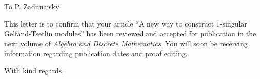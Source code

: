 \documentclass[a4paper,12pt]{letter}
\begin{document}
\begin{letter}{}

\opening{To P. Zadunaisky}

This letter is to confirm that your article ``A new way to construct 
$1$-singular Gelfand-Tsetlin modules'' has been reviewed and accepted for 
publication in the next volume of \emph{Algebra and Discrete Mathematics}. 
You will soon be receiving information regarding publication dates and proof 
editing.

\closing{With kind regards,}

\end{letter}
\end{document}
